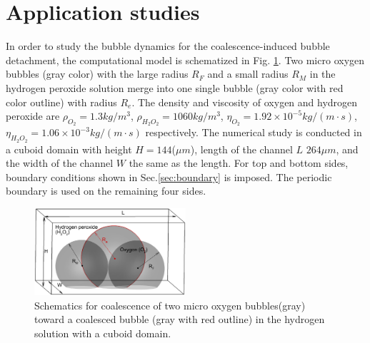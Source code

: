 \documentclass[10pt]{elsarticle}
\begin{document}
\section{Application studies}
\label{sec:application}
In order to study the bubble dynamics for the coalescence-induced bubble detachment, the computational model is schematized in Fig. \ref{fig:schematic}. Two micro oxygen bubbles (gray color) with the large radius $R_F$ and a small radius $R_M$ in the hydrogen peroxide solution merge into one single bubble (gray color with red color outline) with radius $R_e$. The density and viscosity of oxygen and hydrogen peroxide are $\rho_{O_2}=1.3kg/m^3$,  $\rho_{H_2O_2}=1060kg/m^3$, $\eta_{O_2}=1.92\times 10^{-5}kg/(m\cdot s)$, $\eta_{H_2O_2}=1.06\times 10^{-3}kg/(m\cdot s)$ respectively. The numerical study is conducted in a cuboid domain with height $H=144$($\mu m$), length of the channel $L$ $264 \mu m$, and the width of the channel $W$ the same as the length. For top and bottom sides, boundary conditions shown in Sec.\ref{sec:boundary} is imposed. The periodic boundary is used on the remaining four sides.
\begin{figure}[!htpb]
  \centering
  \includegraphics[width=0.5\textwidth]{Schematics.eps}
  \caption{Schematics for coalescence of two micro oxygen bubbles(gray) toward a coalesced bubble (gray with red outline) in the hydrogen solution with a cuboid domain.}\label{fig:schematic}
\end{figure}
\end{document}
